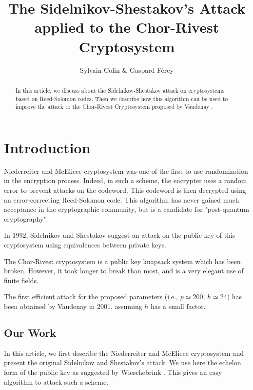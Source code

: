 \documentclass[12pt,a4paper,titlepage]{article}
\author{Sylvain Colin \& Gaspard Férey}
\title{The Sidelnikov-Shestakov's Attack applied to the Chor-Rivest Cryptosystem}
\begin{document}
\maketitle
\tableofcontents


\begin{abstract}

In this article, we discuss about the Sidelnikov-Shestakov attack on cryptosystems based on Reed-Solomon codes. Then we describe how this algorithm can be used to improve the attack to the Chor-Rivest Cryptosystem proposed by Vaudenay \cite{Vau01}.

\end{abstract}



\newpage
\section{Introduction}
\label{sec:intro}

Niederreiter and McEliece cryptosystem \cite{NiederH86} was one of the first to use randomization in the encryption process. Indeed, in such a scheme, the encrypter uses a random error to prevent attacks on the codeword. This codeword is then decrypted using an error-correcting Reed-Solomon code. This algorithm has never gained much acceptance in the cryptographic community, but is a candidate for "post-quantum cryptography".

In 1992, Sidelnikov and Shestakov suggest an attack \cite{SidelShes92} on the public key of this cryptosystem using equivalences between private keys.

The Chor-Rivest cryptosystem \cite{ChorRiv88} is a public key knapsack system which has been broken.  However, it took longer to break than most, and is a very elegant use of finite fields.

The first efficient attack for the proposed parameters (i.e., $p \simeq 200$, $h \simeq 24$) has been obtained by Vaudenay in 2001, assuming $h$ has a small factor.


\subsection{Our Work}
In this article, we first describe the Niederreiter and McEliece cryptosystem and present the original Sidelnikov and Shestakov's attack. We use here the echelon form of the public key as suggested by Wieschebrink \cite{Wiesch}. This gives an easy algorithm to attack such a scheme.
\end{document}
